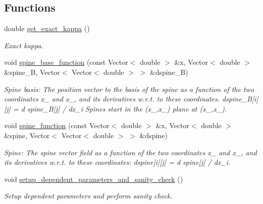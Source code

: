 \subsection*{Functions}
\begin{DoxyCompactItemize}
\item 
double \hyperlink{namespaceGlobalParameters_a4571d41514b16946dd31d075d44c5593}{get\+\_\+exact\+\_\+kappa} ()
\begin{DoxyCompactList}\small\item\em Exact kappa. \end{DoxyCompactList}\item 
void \hyperlink{namespaceGlobalParameters_ac81daf87f8d3f075d9fd108427e70c4f}{spine\+\_\+base\+\_\+function} (const Vector$<$ double $>$ \&x, Vector$<$ double $>$ \&spine\+\_\+B, Vector$<$ Vector$<$ double $>$ $>$ \&dspine\+\_\+B)
\begin{DoxyCompactList}\small\item\em Spine basis\+: The position vector to the basis of the spine as a function of the two coordinates x\+\_ and x\+\_, and its derivatives w.\+r.\+t. to these coordinates. dspine\+\_\+B\mbox{[}i\mbox{]}\mbox{[}j\mbox{]} = d spine\+\_\+B\mbox{[}j\mbox{]} / dx\+\_\+i Spines start in the (x\+\_,x\+\_) plane at (x\+\_,x\+\_). \end{DoxyCompactList}\item 
void \hyperlink{namespaceGlobalParameters_a82df8c67f58e78a236fb6a0cc8bf8284}{spine\+\_\+function} (const Vector$<$ double $>$ \&x, Vector$<$ double $>$ \&spine, Vector$<$ Vector$<$ double $>$ $>$ \&dspine)
\begin{DoxyCompactList}\small\item\em Spine\+: The spine vector field as a function of the two coordinates x\+\_ and x\+\_, and its derivatives w.\+r.\+t. to these coordinates\+: dspine\mbox{[}i\mbox{]}\mbox{[}j\mbox{]} = d spine\mbox{[}j\mbox{]} / dx\+\_\+i. \end{DoxyCompactList}\item 
void \hyperlink{namespaceGlobalParameters_aedbc21f2c81d445634badfc5cdd77436}{setup\+\_\+dependent\+\_\+parameters\+\_\+and\+\_\+sanity\+\_\+check} ()
\begin{DoxyCompactList}\small\item\em Setup dependent parameters and perform sanity check. \end{DoxyCompactList}\end{DoxyCompactItemize}
